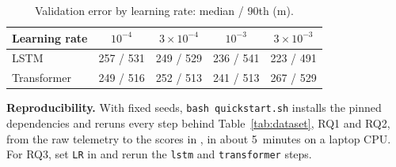\documentclass[sigconf]{acmart}
\begin{document}
\begin{table}[!ht]
\centering\footnotesize
\caption{Validation error by learning rate: median / 90th (m).}
\label{tab:rq3}
\begin{tabular}{@{}lcccc@{}}
\toprule
Learning rate & $10^{-4}$ & $3{\times}10^{-4}$ & $10^{-3}$ & $3{\times}10^{-3}$ \\
\midrule
LSTM        & 257 / 531 & 249 / 529 & 236 / 541 & 223 / 491 \\
Transformer & 249 / 516 & 252 / 513 & 241 / 513 & 267 / 529 \\
\bottomrule
\end{tabular}
\end{table}


\textbf{Reproducibility.} With fixed seeds, \texttt{bash quickstart.sh} installs the pinned dependencies and reruns every step behind Table~\ref{tab:dataset}, RQ1 and RQ2, from the raw telemetry to the scores in , in about 5~minutes on a laptop CPU. For RQ3, set \texttt{LR} in  and rerun the \texttt{lstm} and \texttt{transformer} steps.




\end{document}
